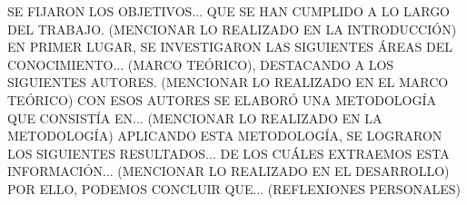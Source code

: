 SE FIJARON LOS OBJETIVOS... QUE SE HAN CUMPLIDO A LO LARGO DEL TRABAJO. (MENCIONAR LO REALIZADO EN LA INTRODUCCIÓN)
EN PRIMER LUGAR, SE INVESTIGARON LAS SIGUIENTES ÁREAS DEL CONOCIMIENTO... (MARCO TEÓRICO), DESTACANDO A LOS SIGUIENTES AUTORES. (MENCIONAR LO REALIZADO EN EL MARCO TEÓRICO)
CON ESOS AUTORES SE ELABORÓ UNA METODOLOGÍA QUE CONSISTÍA EN... (MENCIONAR LO REALIZADO EN LA METODOLOGÍA)
APLICANDO ESTA METODOLOGÍA, SE LOGRARON LOS SIGUIENTES RESULTADOS... DE LOS CUÁLES EXTRAEMOS ESTA INFORMACIÓN... (MENCIONAR LO REALIZADO EN EL DESARROLLO)
POR ELLO, PODEMOS CONCLUIR QUE... (REFLEXIONES PERSONALES)

